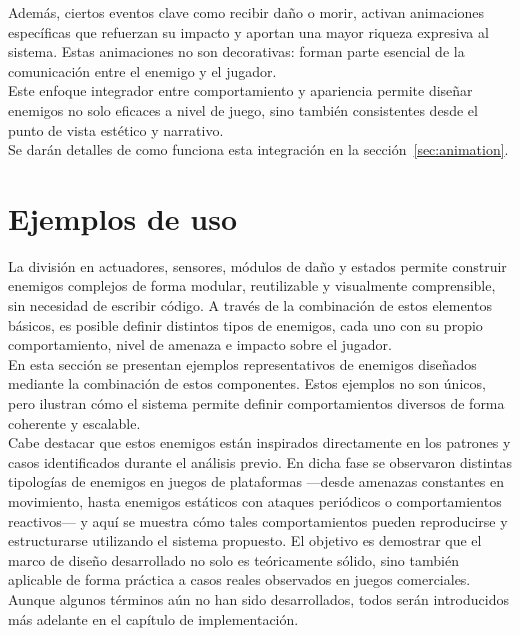 Además, ciertos eventos clave como recibir daño o morir, activan animaciones específicas que refuerzan su impacto y aportan una mayor riqueza expresiva al sistema. Estas animaciones no son decorativas: forman parte esencial de la comunicación entre el enemigo y el jugador.\\

Este enfoque integrador entre comportamiento y apariencia permite diseñar enemigos no solo eficaces a nivel de juego, sino también consistentes desde el punto de vista estético y narrativo.\\

Se darán detalles de como funciona esta integración en la sección~\ref{sec:animation}.

\section{Ejemplos de uso}
La división en actuadores, sensores, módulos de daño y estados permite construir enemigos complejos de forma modular, reutilizable y visualmente comprensible, sin necesidad de escribir código. A través de la combinación de estos elementos básicos, es posible definir distintos tipos de enemigos, cada uno con su propio comportamiento, nivel de amenaza e impacto sobre el jugador.\\

En esta sección se presentan ejemplos representativos de enemigos diseñados mediante la combinación de estos componentes. Estos ejemplos no son únicos, pero ilustran cómo el sistema permite definir comportamientos diversos de forma coherente y escalable.\\

Cabe destacar que estos enemigos están inspirados directamente en los patrones y casos identificados durante el análisis previo. En dicha fase se observaron distintas tipologías de enemigos en juegos de plataformas —desde amenazas constantes en movimiento, hasta enemigos estáticos con ataques periódicos o comportamientos reactivos— y aquí se muestra cómo tales comportamientos pueden reproducirse y estructurarse utilizando el sistema propuesto. El objetivo es demostrar que el marco de diseño desarrollado no solo es teóricamente sólido, sino también aplicable de forma práctica a casos reales observados en juegos comerciales.\\

Aunque algunos términos aún no han sido desarrollados, todos serán introducidos más adelante en el capítulo de implementación.

